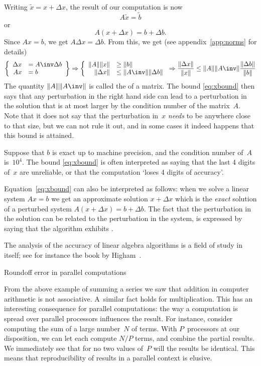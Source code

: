 Writing $\tilde x= x+\Delta x$, the result of our computation is now
\[ A\tilde x = \tilde b \] or \[ A(x+\Delta x)=b+\Delta b. \]
Since $Ax=b$, we get $A\Delta x=\Delta b$. From this, we get
(see appendix~\ref{app:norms} for details)
\begin{equation}
 \left \{
\begin{array}{rl}
  \Delta x&=A\inv \Delta b\\ Ax&=b
\end{array} \right\} \Rightarrow \left\{
\begin{array}{rl}
  \|A\| \|x\|&\geq\|b\| \\ \|\Delta x\|&\leq \|A\inv\| \|\Delta b\|
\end{array} \right.
\Rightarrow
\frac{\|\Delta x\|}{\|x\|}
\leq 
\|A\| \|A\inv\| \frac{\|\Delta b\|}{\|b\|}
    \label{eq:xbound}
\end{equation}
The quantity $\|A\| \|A\inv\|$ is called the  of a matrix. The bound \eqref{eq:xbound} then says that any
perturbation in the right hand side can lead to a perturbation in the
solution that is at most larger by the condition number of the
matrix~$A$. Note that it does not say that the perturbation in~$x$
\emph{needs} to be anywhere close to that size, but we can not rule it
out, and in some cases it indeed happens that this bound is attained.

Suppose that $b$ is exact up to machine precision, and the
condition number of~$A$ is~$10^4$. The bound \eqref{eq:xbound} is
often interpreted as saying that the last 4 digits of~$x$ are
unreliable, or that the computation `loses 4 digits of accuracy'.

Equation~\eqref{eq:xbound} can also be interpreted as follows: when we
solve a linear system $Ax=b$ we get an approximate solution $x+\Delta
x$ which is the \emph{exact} solution of a perturbed system
$A(x+\Delta x)=b+\Delta b$. The fact that the perturbation in the
solution can be related to the perturbation in the system, is
expressed by saying that the algorithm exhibits .

The analysis of the accuracy of linear algebra algorithms is a field
of study in itself; see for instance the book by
Higham~\cite{Higham:2002:ASN}.

 {Roundoff error in parallel computations}

From the above example of summing a series we saw that addition in
computer arithmetic is not associative. A~similar fact holds for
multiplication. 
This has an interesting consequence for parallel computations: the way
a computation is spread over parallel processors influences the
result. For instance, consider computing the sum of a large number~$N$ of
terms. With $P$~processors at our disposition, we can let each compute
$N/P$ terms, and combine the partial results. We immediately see that
for no two values of~$P$ will the results be identical. This means
that reproducibility of results in a parallel context is elusive.

